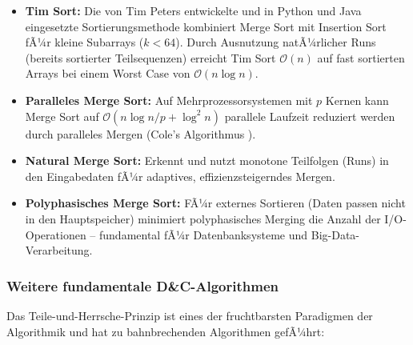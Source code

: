 ﻿\documentclass[a4paper,12pt]{article}
\theoremstyle{definition}
\begin{document}
\begin{itemize}
    \item \textbf{Tim Sort:} Die von Tim Peters entwickelte und in Python und Java
          eingesetzte Sortierungsmethode kombiniert Merge Sort mit Insertion Sort
          fÃ¼r kleine Subarrays ($k < 64$). Durch Ausnutzung natÃ¼rlicher Runs
          (bereits sortierter Teilsequenzen) erreicht Tim Sort $\mathcal{O}(n)$
          auf fast sortierten Arrays bei einem Worst Case von $\mathcal{O}(n \log n)$.
    \item \textbf{Paralleles Merge Sort:} Auf Mehrprozessorsystemen mit $p$ Kernen
          kann Merge Sort auf $\mathcal{O}(n \log n / p + \log^2 n)$ parallele
          Laufzeit reduziert werden durch paralleles Mergen (Cole's Algorithmus
          \cite{cole1988}).
    \item \textbf{Natural Merge Sort:} Erkennt und nutzt monotone Teilfolgen
          (Runs) in den Eingabedaten fÃ¼r adaptives, effizienzsteigerndes Mergen.
    \item \textbf{Polyphasisches Merge Sort:} FÃ¼r externes Sortieren (Daten
          passen nicht in den Hauptspeicher) minimiert polyphasisches Merging
          die Anzahl der I/O-Operationen -- fundamental fÃ¼r Datenbanksysteme
          und Big-Data-Verarbeitung.
\end{itemize}

\subsubsection{Weitere fundamentale D\&C-Algorithmen}

Das Teile-und-Herrsche-Prinzip ist eines der fruchtbarsten Paradigmen der
Algorithmik und hat zu bahnbrechenden Algorithmen gefÃ¼hrt:
\end{document}
